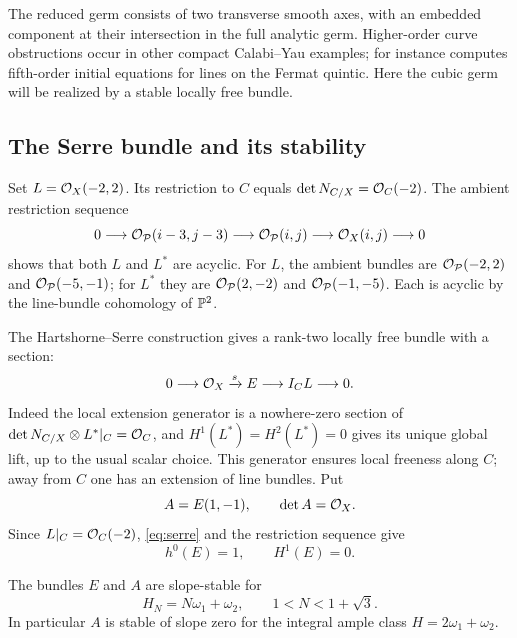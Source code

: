 The reduced germ consists of two transverse smooth axes, with an
embedded component at their intersection in the full analytic germ.
Higher-order curve obstructions occur in other compact Calabi--Yau
examples; for instance \cite[Section~5.2]{ashok} computes fifth-order
initial equations for lines on the Fermat quintic. Here the cubic
germ will be realized by a stable locally free bundle.

\subsection{The Serre bundle and its stability}
Set $L=\mathcal O_X(-2,2)$. Its restriction to $C$ equals
$\det N_{C/X}=\mathcal O_C(-2)$. The ambient restriction sequence
\begin{equation}\label{eq:restriction}
 0\longrightarrow\mathcal O_{\mathcal P}(i-3,j-3)
 \longrightarrow\mathcal O_{\mathcal P}(i,j)
 \longrightarrow\mathcal O_X(i,j)\longrightarrow0
\end{equation}
shows that both $L$ and $L^*$ are acyclic.
For $L$, the ambient bundles are $\mathcal O_{\mathcal P}(-2,2)$ and
$\mathcal O_{\mathcal P}(-5,-1)$; for $L^*$ they are
$\mathcal O_{\mathcal P}(2,-2)$ and $\mathcal O_{\mathcal P}(-1,-5)$.
Each is acyclic by the line-bundle cohomology of $\mathbb P^2$.

The Hartshorne--Serre construction \cite{hartshorne,thomas} gives
a rank-two locally free bundle with a section:
\begin{equation}\label{eq:serre}
 0\longrightarrow\mathcal O_X\xrightarrow{s}E
       \longrightarrow I_CL\longrightarrow0 .
\end{equation}
Indeed the local extension generator is a nowhere-zero section of
$\det N_{C/X}\otimes L^*|_C=\mathcal O_C$, and
$H^1(L^*)=H^2(L^*)=0$ gives its unique global lift, up to the
usual scalar choice. This generator ensures local freeness along
$C$; away from $C$ one has an extension of line bundles.
Put
\[
 A=E(1,-1),\qquad \det A=\mathcal O_X .
\]
Since $L|_C=\mathcal O_C(-2)$, \eqref{eq:serre} and the restriction
sequence give
\begin{equation}\label{eq:section-cohomology}
 h^0(E)=1,\qquad H^1(E)=0 .
\end{equation}

\begin{proposition}\label{prop:stability}
The bundles $E$ and $A$ are slope-stable for
\[
 H_N=N\omega_1+\omega_2,\qquad 1<N<1+\sqrt3.
\]
In particular $A$ is stable of slope zero for the integral ample
class $H=2\omega_1+\omega_2$.
\end{proposition}

